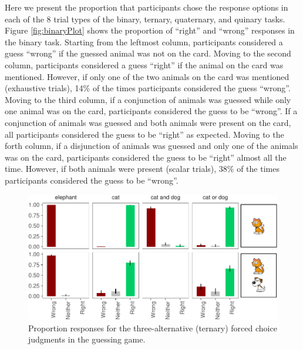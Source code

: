 \documentclass[floatsintext,man]{apa6}
\theoremstyle{definition}
\theoremstyle{definition}
\theoremstyle{definition}
\theoremstyle{remark}
\begin{document}
Here we present the proportion that participants chose the response
options in each of the 8 trial types of the binary, ternary, quaternary,
and quinary tasks. Figure \ref{fig:binaryPlot} shows the proportion of
\enquote{right} and \enquote{wrong} responses in the binary task.
Starting from the leftmost column, participants considered a guess
\enquote{wrong} if the guessed animal was not on the card. Moving to the
second column, participants considered a guess \enquote{right} if the
animal on the card was mentioned. However, if only one of the two
animals on the card was mentioned (exhaustive trials), 14\% of the times
participants considered the guess \enquote{wrong}. Moving to the third
column, if a conjunction of animals was guessed while only one animal
was on the card, participants considered the guess to be
\enquote{wrong}. If a conjunction of animals was guessed and both
animals were present on the card, all participants considered the guess
to be \enquote{right} as expected. Moving to the forth column, if a
disjunction of animals was guessed and only one of the animals was on
the card, participants considered the guess to be \enquote{right} almost
all the time. However, if both animals were present (scalar trials),
38\% of the times participants considered the guess to be
\enquote{wrong}.

\begin{figure}
\centering
\includegraphics{writeup_files/figure-latex/ternaryPlot-1.pdf}
\caption{\label{fig:ternaryPlot}Proportion responses for the
three-alternative (ternary) forced choice judgments in the guessing
game.}
\end{figure}
\end{document}
